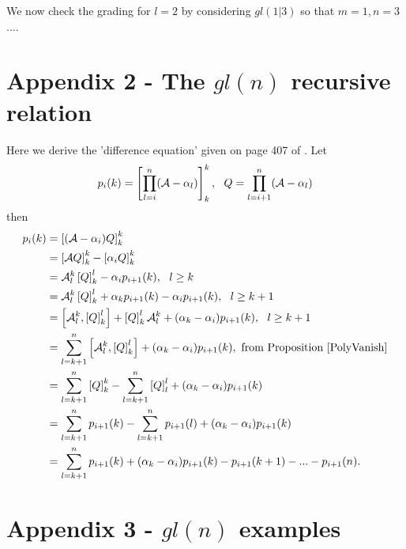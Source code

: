 \documentclass[12pt]{article}
\def\nn{\nonumber}
\begin{document}
\newpage
We now check the grading for $l=2$ by considering $gl(1|3)$ so that $m=1,n=3$....

\newpage
\section*{Appendix 2 - The $gl(n)$ recursive relation}
Here we derive the 'difference equation' given on page 407 of \cite{Gould1978}.
Let 
$$
p_i(k) = \left[ \prod^{n}_{l=i} ({\cal A} - \alpha_l) \right]^k_k,~~Q= \prod^{n}_{l=i+1} ({\cal A} - \alpha_l)
$$
then
\begin{align}
p_i(k) &= \left[ ({\cal A} - \alpha_i) Q \right]^k_k \nn\\
&= \left[ {\cal A} Q \right]^k_k - \left[ \alpha_i Q \right]^k_k \nn\\
&= {\cal A}^k_l \left[ Q \right]^l_k - \alpha_i p_{i+1}(k),~~l \geq k \nn\\
&= {\cal A}^k_l \left[ Q \right]^l_k + \alpha_k p_{i+1}(k) - \alpha_i p_{i+1}(k),~~l \geq k+1 \nn\\
&= \left[{\cal A}^k_l , \left[Q \right]^l_k \right] 
+ \left[Q \right]^l_k {\cal A}^k_l 
+ (\alpha_k - \alpha_i) p_{i+1}(k),~~l \geq k+1 \nn \\
&= \sum_{l=k+1}^{n} \left[{\cal A}^k_l , \left[Q \right]^l_k \right] 
+ (\alpha_k - \alpha_i) p_{i+1}(k), \nn \hbox{~from Proposition \ref{PolyVanish}} \nn\\
&= \sum_{l=k+1}^{n} \left[Q \right]^k_k - \sum_{l=k+1}^{n} \left[Q \right]^l_l + (\alpha_k - \alpha_i) p_{i+1}(k) \nn \\
&= \sum_{l=k+1}^{n}  p_{i+1}(k) - \sum_{l=k+1}^{n} p_{i+1}(l) + (\alpha_k - \alpha_i) p_{i+1}(k) \nn \\
&= \sum_{l=k+1}^{n}  p_{i+1}(k)  + (\alpha_k - \alpha_i)p_{i+1}(k) - p_{i+1}(k+1) - ... - p_{i+1}(n) .
\end{align}

\newpage
\section*{Appendix 3 - $gl(n)$ examples}
\end{document}
